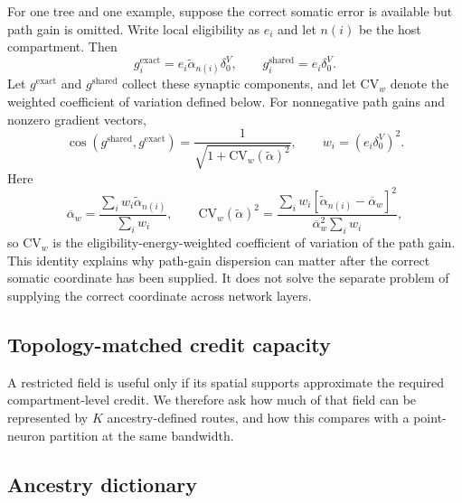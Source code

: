 For one tree and one example, suppose the correct somatic error is available
but path gain is omitted. Write local eligibility as $e_i$ and let $n(i)$ be
the host compartment. Then
\begin{equation}
g_i^{\mathrm{exact}}=e_i\widetilde\alpha_{n(i)}\delta_0^V,
\qquad
g_i^{\mathrm{shared}}=e_i\delta_0^V.
\end{equation}
Let $g^{\mathrm{exact}}$ and $g^{\mathrm{shared}}$ collect these synaptic
components, and let $\mathrm{CV}_w$ denote the weighted coefficient of
variation defined below. For nonnegative path gains and nonzero gradient vectors,
\begin{equation}
\cos(g^{\mathrm{shared}},g^{\mathrm{exact}})
=\frac{1}{\sqrt{1+\mathrm{CV}_w(\widetilde\alpha)^2}},
\qquad w_i=(e_i\delta_0^V)^2.
\label{eq:s_alignment}
\end{equation}
Here
\begin{equation}
\overline\alpha_w=\frac{\sum_iw_i\widetilde\alpha_{n(i)}}{\sum_iw_i},
\qquad
\mathrm{CV}_w(\widetilde\alpha)^2
=\frac{\sum_iw_i[\widetilde\alpha_{n(i)}-\overline\alpha_w]^2}
{\overline\alpha_w^2\sum_iw_i},
\end{equation}
so $\mathrm{CV}_w$ is the eligibility-energy-weighted coefficient of
variation of the path gain.
This identity explains why path-gain dispersion can matter after the correct
somatic coordinate has been supplied. It does not solve the separate problem
of supplying the correct coordinate across network layers.

\subsection{Topology-matched credit capacity}
\label{note:capacity_theory}

A restricted field is useful only if its spatial supports approximate the
required compartment-level credit. We therefore ask how much of that field can
be represented by $K$ ancestry-defined routes, and how this compares with a
point-neuron partition at the same bandwidth.

\subsection{Ancestry dictionary}

